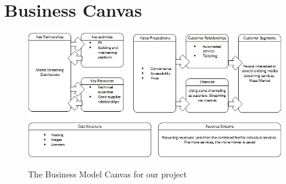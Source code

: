 \section{Business Canvas}
\label{sec:business_canvas}

\begin{figure}[h]
    \begin{center}
        \includegraphics[scale=0.7]{./pics/model_canvas}
        \label{fig:model_canvas}
        \caption{The Business Model Canvas for our project}
    \end{center}
\end{figure}